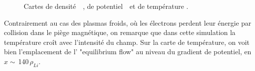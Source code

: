 \begin{refsection}
	\begin{figure}[!htbp]
    \centering
    \caption{Cartes de densité~~, de
    potentiel~~et de température
   .}
    \label{2-CartesWithTeFiltre}
	\end{figure}
	
Contrairement au cas des plasmas froids, où les électrons perdent leur énergie
par collision dans le piège magnétique, on
remarque que dans cette simulation la température croît avec
l'intensité du champ. Sur la carte de température, on voit bien l'emplacement de
l' "equilibrium flow" au niveau du gradient de potentiel, en
$x\sim\,$140$\,\rho_{Li}$.
	

\end{refsection}
